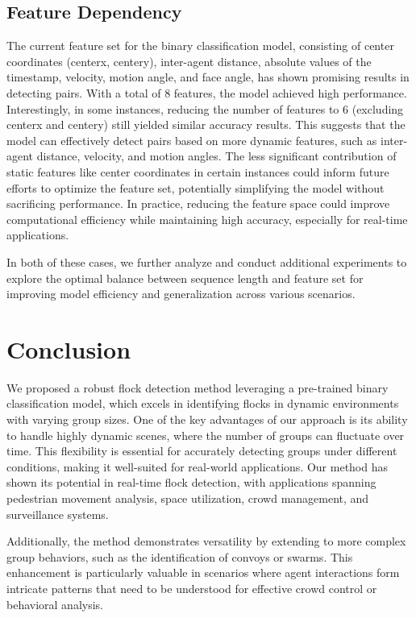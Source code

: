 \documentclass{article}
\begin{document}
\subsection*{Feature Dependency}
The current feature set for the binary classification model, consisting of center coordinates (centerx, centery), inter-agent distance, absolute values of the timestamp, velocity, motion angle, and face angle, has shown promising results in detecting pairs. With a total of 8 features, the model achieved high performance. Interestingly, in some instances, reducing the number of features to 6 (excluding centerx and centery) still yielded similar accuracy results. This suggests that the model can effectively detect pairs based on more dynamic features, such as inter-agent distance, velocity, and motion angles. The less significant contribution of static features like center coordinates in certain instances could inform future efforts to optimize the feature set, potentially simplifying the model without sacrificing performance. In practice, reducing the feature space could improve computational efficiency while maintaining high accuracy, especially for real-time applications.

In both of these cases, we further analyze and conduct additional experiments to explore the optimal balance between sequence length and feature set for improving model efficiency and generalization across various scenarios.

\section{Conclusion}

We proposed a robust flock detection method leveraging a pre-trained binary classification model, which excels in identifying flocks in dynamic environments with varying group sizes. One of the key advantages of our approach is its ability to handle highly dynamic scenes, where the number of groups can fluctuate over time. This flexibility is essential for accurately detecting groups under different conditions, making it well-suited for real-world applications. Our method has shown its potential in real-time flock detection, with applications spanning pedestrian movement analysis, space utilization, crowd management, and surveillance systems.

Additionally, the method demonstrates versatility by extending to more complex group behaviors, such as the identification of convoys or swarms. This enhancement is particularly valuable in scenarios where agent interactions form intricate patterns that need to be understood for effective crowd control or behavioral analysis.
\end{document}
